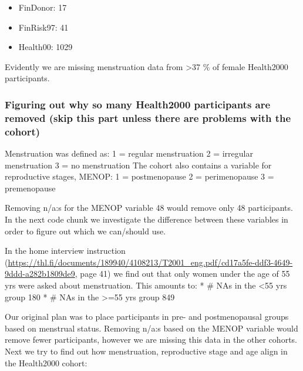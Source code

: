 \documentclass[
]{article}
\providecommand{\tightlist}{%
  \setlength{\itemsep}{0pt}\setlength{\parskip}{0pt}}
\begin{document}
\begin{itemize}
\tightlist
\item
  FinDonor: 17
\item
  FinRisk97: 41
\item
  Health00: 1029
\end{itemize}

Evidently we are missing menstruation data from \textgreater37 \% of
female Health2000 participants.

\hypertarget{figuring-out-why-so-many-health2000-participants-are-removed-skip-this-part-unless-there-are-problems-with-the-cohort}{%
\subsubsection{Figuring out why so many Health2000 participants are
removed (skip this part unless there are problems with the
cohort)}\label{figuring-out-why-so-many-health2000-participants-are-removed-skip-this-part-unless-there-are-problems-with-the-cohort}}

Menstruation was defined as: 1 = regular menstruation 2 = irregular
menstruation 3 = no menstruation The cohort also contains a variable for
reproductive stages, MENOP: 1 = postmenopause 2 = perimenopause 3 =
premenopause

Removing n/a:s for the MENOP variable 48 would remove only 48
participants. In the next code chunk we investigate the difference
between these variables in order to figure out which we can/should use.

In the home interview instruction
(\url{https://thl.fi/documents/189940/4108213/T2001_eng.pdf/cd17a5fe-ddf3-4649-9ddd-a282b1809de9},
page 41) we find out that only women under the age of 55 yrs were asked
about menstruation. This amounts to: * \# NAs in the \textless55 yrs
group 180 * \# NAs in the \textgreater=55 yrs group 849

Our original plan was to place participants in pre- and postmenopausal
groups based on menstrual status. Removing n/a:s based on the MENOP
variable would remove fewer participants, however we are missing this
data in the other cohorts. Next we try to find out how menstruation,
reproductive stage and age align in the Health2000 cohort:
\end{document}
